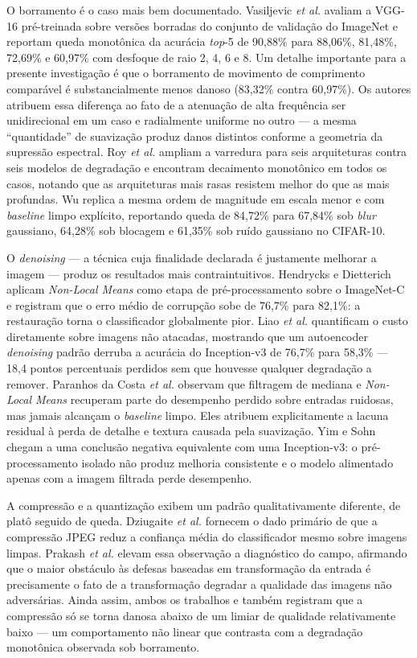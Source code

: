 \documentclass[conference]{IEEEtran}
\begin{document}
O borramento é o caso mais bem documentado. Vasiljevic \textit{et al.}
\cite{b4} avaliam a VGG-16 pré-treinada sobre versões borradas do conjunto de
validação do ImageNet e reportam queda monotônica da acurácia \textit{top}-5 de
90,88\% para 88,06\%, 81,48\%, 72,69\% e 60,97\% com desfoque de raio 2, 4, 6 e
8. Um detalhe importante para a presente investigação é que o
borramento de movimento de comprimento comparável é substancialmente menos
danoso (83,32\% contra 60,97\%). Os autores atribuem essa diferença ao fato de a
atenuação de alta frequência ser unidirecional em um caso e radialmente
uniforme no outro --- a mesma ``quantidade'' de suavização produz danos
distintos conforme a geometria da supressão espectral. Roy \textit{et al.}
\cite{b5} ampliam a varredura para seis arquiteturas contra seis modelos de
degradação e encontram decaimento monotônico em todos os casos, notando que 
as arquiteturas mais rasas resistem melhor do que as mais profundas. Wu \cite{b28} 
replica a mesma ordem de magnitude em escala menor e com \textit{baseline} limpo 
explícito, reportando queda de 84,72\% para 67,84\% sob \textit{blur} gaussiano, 
64,28\% sob blocagem e 61,35\% sob ruído gaussiano no CIFAR-10.

O \textit{denoising} --- a técnica cuja finalidade declarada é justamente
melhorar a imagem --- produz os resultados mais contraintuitivos. Hendrycks e
Dietterich \cite{b6} aplicam \textit{Non-Local Means} como etapa de
pré-processamento sobre o ImageNet-C e registram que o erro médio de corrupção
sobe de 76,7\% para 82,1\%: a restauração torna o classificador globalmente
pior. Liao \textit{et al.} \cite{b7} quantificam o custo diretamente sobre
imagens não atacadas, mostrando que um autoencoder \textit{denoising} padrão
derruba a acurácia do Inception-v3 de 76,7\% para 58,3\% --- 18,4 pontos
percentuais perdidos sem que houvesse qualquer degradação a remover. Paranhos
da Costa \textit{et al.} \cite{b8} observam que filtragem de mediana e 
\textit{Non-Local Means} recuperam parte do desempenho perdido sobre entradas 
ruidosas, mas jamais alcançam o \textit{baseline} limpo. Eles atribuem explicitamente 
a lacuna residual à perda de detalhe e textura causada pela suavização. Yim e Sohn \cite{b9} 
chegam a uma conclusão negativa equivalente com uma Inception-v3: o pré-processamento 
isolado não produz melhoria consistente e o modelo alimentado apenas com a imagem 
filtrada perde desempenho.

A compressão e a quantização exibem um padrão qualitativamente diferente, de
platô seguido de queda. Dziugaite \textit{et al.} \cite{b10} fornecem o dado
primário de que a compressão JPEG reduz a confiança média do classificador 
mesmo sobre imagens limpas. Prakash \textit{et al.} \cite{b11} elevam essa observação 
a diagnóstico do campo, afirmando que o maior obstáculo às defesas baseadas em 
transformação da entrada é precisamente o fato de a transformação degradar a qualidade 
das imagens não adversárias. Ainda assim, ambos os trabalhos e também \cite{b1} registram que a
compressão só se torna danosa abaixo de um limiar de qualidade relativamente
baixo --- um comportamento não linear que contrasta com a degradação monotônica
observada sob borramento.
\end{document}
